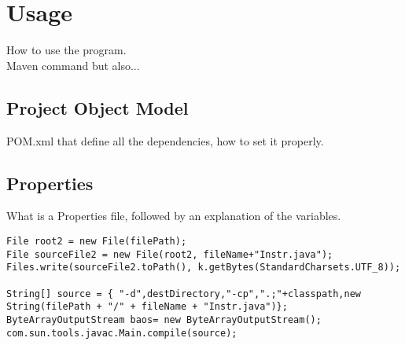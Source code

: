 \chapter{Usage}
How to use the program.\\
Maven command but also...
\section{Project Object Model}
POM.xml that define all the dependencies, how to set it properly.
\section{Properties}
What is a Properties file, followed by an explanation of the variables.


\lstset{language=Java}          %
\begin{lstlisting}[caption={Testing how to print code!}]  % Start your code-block
File root2 = new File(filePath);
File sourceFile2 = new File(root2, fileName+"Instr.java");
Files.write(sourceFile2.toPath(), k.getBytes(StandardCharsets.UTF_8));

String[] source = { "-d",destDirectory,"-cp",".;"+classpath,new String(filePath + "/" + fileName + "Instr.java")};
ByteArrayOutputStream baos= new ByteArrayOutputStream();
com.sun.tools.javac.Main.compile(source);
\end{lstlisting}
\newpage